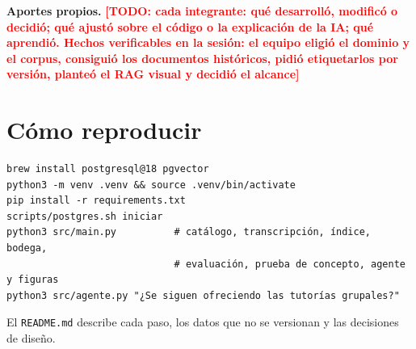 \documentclass[11pt,letterpaper]{article}
\newcommand{\pendiente}[1]{\textcolor{red}{\textbf{[TODO: #1]}}}
\newcommand{\cod}[1]{\texttt{\small #1}}
\begin{document}
\textbf{Aportes propios.} \pendiente{cada integrante: qué desarrolló, modificó o decidió; qué ajustó sobre el código o la explicación de la IA; qué aprendió. Hechos verificables en la sesión: el equipo eligió el dominio y el corpus, consiguió los documentos históricos, pidió etiquetarlos por versión, planteó el RAG visual y decidió el alcance}

\appendix
\section{Cómo reproducir}

\begin{verbatim}
brew install postgresql@18 pgvector
python3 -m venv .venv && source .venv/bin/activate
pip install -r requirements.txt
scripts/postgres.sh iniciar
python3 src/main.py          # catálogo, transcripción, índice, bodega,
                             # evaluación, prueba de concepto, agente y figuras
python3 src/agente.py "¿Se siguen ofreciendo las tutorías grupales?"
\end{verbatim}

El \cod{README.md} describe cada paso, los datos que no se versionan y las decisiones de diseño.
\end{document}
